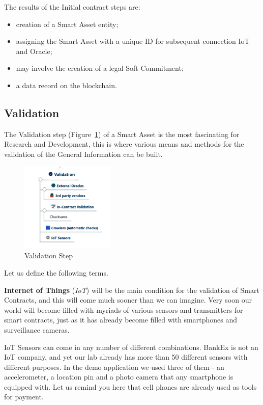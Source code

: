 \documentclass{article}
\begin{document}
\begin{multicols}{2}
The results of the Initial contract steps are:

\begin{itemize}
\item creation of a Smart Asset entity;
\item assigning the Smart Asset with a unique ID for subsequent connection IoT and Oracle;
\item may involve the creation of a legal Soft Commitment;
\item a data record on the blockchain.
\end{itemize}

\subsection{Validation}

The Validation step (Figure~\ref{fig:validation}) of a Smart Asset is the most fascinating for Research and Development, this is where various means and methods for the validation of the General Information can be built.

\begin{figure}
  \centering
  \includegraphics[width=0.4\textwidth]{validation.png}
  \caption{Validation Step}
  \label{fig:validation}
\end{figure}

Let us define the following terms.

\textbf{Internet of Things} (\textit{IoT}) will be the main condition for the validation of Smart Contracts, and this will come much sooner than we can imagine. Very soon our world will become filled with myriads of various sensors and transmitters for smart contracts, just as it has already become filled with smartphones and surveillance cameras. 

IoT Sensors can come in any number of different combinations. BankEx is not an IoT company, and yet our lab already has more than 50 different sensors with different purposes. In the demo application we used three of them - an accelerometer, a location pin and a photo camera that any smartphone is equipped with. Let us remind you here that cell phones are already used as tools for payment. 


\end{multicols}
\end{document}
